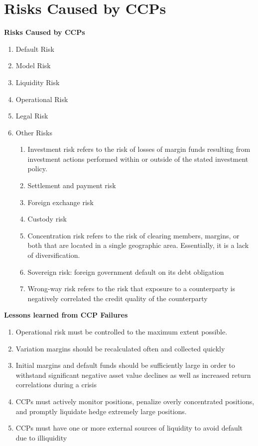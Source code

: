 \documentclass[11pt,fleqn]{report} %
\numberwithin{equation}{section} %
\numberwithin{figure}{section} %
\numberwithin{table}{section} %
\begin{document}
\chapter{Risks Caused by CCPs}
 \begin{definition}\textbf{Risks Caused by CCPs}
 \begin{enumerate}
     \item Default Risk
     \item Model Risk
     \item Liquidity Risk
     \item Operational Risk
     \item Legal Risk
     \item Other Risks
     \begin{enumerate}
         \item Investment risk refers to the risk of losses of margin funds resulting from investment actions performed within or outside of the stated investment policy.
         \item Settlement and payment risk
         \item Foreign exchange risk
         \item Custody risk
         \item Concentration risk refers to the risk of clearing members, margins, or both that are located in a single geographic area. Essentially, it is a lack of diversification.
         \item Sovereign risk: foreign government default on its debt obligation
         \item Wrong-way risk refers to the risk that exposure to a counterparty is negatively correlated the credit quality of the counterparty
     \end{enumerate}
 \end{enumerate}
 \end{definition}
 \begin{definition}\textbf{Lessons learned from CCP Failures}
     \begin{enumerate}
         \item Operational risk must be controlled to the maximum extent possible.
         \item Variation margins should be recalculated often and collected quickly
         \item Initial margins and default funds should be sufficiently large in order to withstand significant negative asset value declines as well as increased return correlations during a crisis
         \item CCPs must actively monitor positions, penalize overly concentrated positions, and promptly liquidate hedge extremely large positions.
         \item CCPs must have one or more external sources of liquidity to avoid default due to illiquidity
     \end{enumerate}
     \end{definition}
\end{document}
